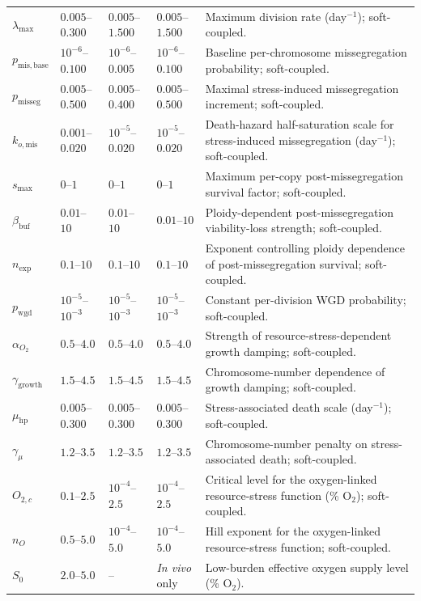 \begin{longtable}{@{}p{}p{}p{}p{}p{}@{}}
$\lambda_{\max}$ & $0.005$--$0.300$ & $0.005$--$1.500$ & $0.005$--$1.500$ & Maximum division rate (day$^{-1}$); soft-coupled. \\
$p_{\mathrm{mis,base}}$ & $10^{-6}$--$0.100$ & $10^{-6}$--$0.005$ & $10^{-6}$--$0.100$ & Baseline per-chromosome missegregation probability; soft-coupled. \\
$p_{\mathrm{misseg}}$ & $0.005$--$0.500$ & $0.005$--$0.400$ & $0.005$--$0.500$ & Maximal stress-induced missegregation increment; soft-coupled. \\
$k_{o,\mathrm{mis}}$ & $0.001$--$0.020$ & $10^{-5}$--$0.020$ & $10^{-5}$--$0.020$ & Death-hazard half-saturation scale for stress-induced missegregation (day$^{-1}$); soft-coupled. \\
$s_{\max}$ & $0$--$1$ & $0$--$1$ & $0$--$1$ & Maximum per-copy post-missegregation survival factor; soft-coupled. \\
$\beta_{\mathrm{buf}}$ & $0.01$--$10$ & $0.01$--$10$ & $0.01$--$10$ & Ploidy-dependent post-missegregation viability-loss strength; soft-coupled. \\
$n_{\mathrm{exp}}$ & $0.1$--$10$ & $0.1$--$10$ & $0.1$--$10$ & Exponent controlling ploidy dependence of post-missegregation survival; soft-coupled. \\
$p_{\mathrm{wgd}}$ & $10^{-5}$--$10^{-3}$ & $10^{-5}$--$10^{-3}$ & $10^{-5}$--$10^{-3}$ & Constant per-division WGD probability; soft-coupled. \\
$\alpha_{O_2}$ & $0.5$--$4.0$ & $0.5$--$4.0$ & $0.5$--$4.0$ & Strength of resource-stress-dependent growth damping; soft-coupled. \\
$\gamma_{\mathrm{growth}}$ & $1.5$--$4.5$ & $1.5$--$4.5$ & $1.5$--$4.5$ & Chromosome-number dependence of growth damping; soft-coupled. \\
$\mu_{\mathrm{hp}}$ & $0.005$--$0.300$ & $0.005$--$0.300$ & $0.005$--$0.300$ & Stress-associated death scale (day$^{-1}$); soft-coupled. \\
$\gamma_{\mu}$ & $1.2$--$3.5$ & $1.2$--$3.5$ & $1.2$--$3.5$ & Chromosome-number penalty on stress-associated death; soft-coupled. \\
$O_{2,c}$ & $0.1$--$2.5$ & $10^{-4}$--$2.5$ & $10^{-4}$--$2.5$ & Critical level for the oxygen-linked resource-stress function (\% O$_2$); soft-coupled. \\
$n_O$ & $0.5$--$5.0$ & $10^{-4}$--$5.0$ & $10^{-4}$--$5.0$ & Hill exponent for the oxygen-linked resource-stress function; soft-coupled. \\
\midrule
$S_0$ & $2.0$--$5.0$ & -- & \textit{In vivo} only & Low-burden effective oxygen supply level (\% O$_2$). \\

\end{longtable}
